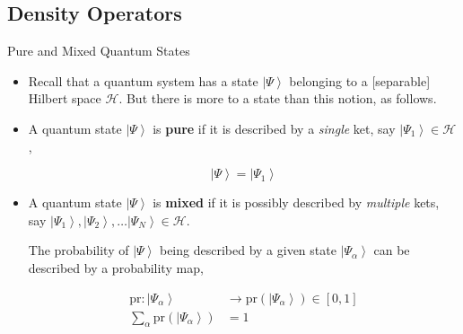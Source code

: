 \documentclass[9pt,handout]{beamer}
\newcommand{\pr}[0]{\text{pr}}
\begin{document}
\subsection{Density Operators}
\begin{frame}{Pure and Mixed Quantum States}
\begin{itemize}
\item Recall that a quantum system has a state $\left\lvert \Psi \right\rangle$ belonging to a [separable] Hilbert space $\mathcal{H}$. But there is more to a state than this notion, as follows.

\item A quantum state $\left\lvert \Psi \right\rangle$ is \textbf{pure} if it is described by a \emph{single} ket, say $\left\lvert \Psi_1 \right\rangle \in \mathcal{H}$,

$$\left\lvert \Psi \right\rangle = \left\lvert \Psi_1 \right\rangle$$

\item A quantum state $\left\lvert \Psi \right\rangle$ is \textbf{mixed} if it is possibly described by \emph{multiple} kets, say $\left\lvert \Psi_1 \right\rangle, \left\lvert \Psi_2 \right\rangle, \dots \left\lvert \Psi_N \right\rangle \in \mathcal{H}$. 

The probability of $\left\lvert \Psi \right\rangle$ being described by a given state $\left\lvert \Psi_\alpha \right\rangle$ can be described by a probability map,

\begin{align*}
\pr : \left\lvert \Psi_\alpha \right\rangle & \to \text{pr} \left( \left\lvert \Psi_\alpha \right\rangle \right) \in \left[ 0, 1 \right] \\
\sum_{\alpha} \pr \left( \left\lvert \Psi_\alpha \right\rangle \right) & = 1
\end{align*}
\end{itemize}
\end{frame}
\end{document}
